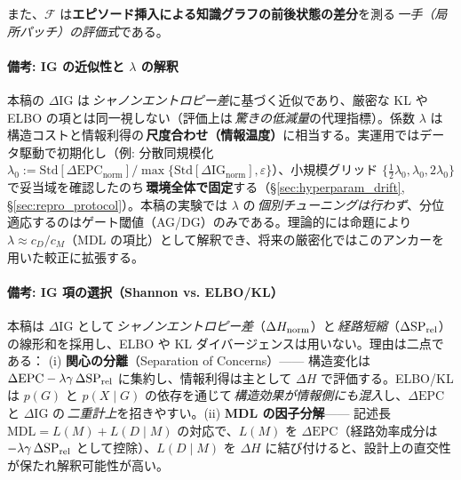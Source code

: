 \documentclass[ja=standard,xelatex]{bxjsarticle}
\newcommand{\F}{\mathcal{F}}
\newcommand{\gednorm}{\Delta\mathrm{EPC}_{\mathrm{norm}}}
\newcommand{\ignorm}{\Delta\mathrm{IG}_{\mathrm{norm}}}
\begin{document}

\noindent また、$\F$ は\textbf{エピソード挿入による知識グラフの前後状態の差分}を測る\,\emph{一手（局所パッチ）の評価式}である。



\paragraph{備考: IG の近似性と $\lambda$ の解釈}
本稿の $\Delta\mathrm{IG}$ は\,\emph{シャノンエントロピー差}に基づく近似であり、厳密な KL や ELBO の項とは同一視しない（評価上は\,\emph{驚きの低減量}の代理指標）。係数 $\lambda$ は構造コストと情報利得の\,\textbf{尺度合わせ（情報温度）}に相当する。実運用ではデータ駆動で初期化し（例: 分散同規模化 $\lambda_0:=\mathrm{Std}[\gednorm]/\max\{\mathrm{Std}[\ignorm],\varepsilon\}$）、小規模グリッド $\{\tfrac{1}{2}\lambda_0,\lambda_0,2\lambda_0\}$ で妥当域を確認したのち\,\textbf{環境全体で固定}する（\S\ref{sec:hyperparam_drift}, \S\ref{sec:repro_protocol}）。本稿の実験では $\lambda$ の\,\emph{個別チューニングは行わず}、分位適応するのはゲート閾値（AG/DG）のみである。理論的には命題により $\lambda\approx c_D/c_M$（MDL の項比）として解釈でき、将来の厳密化ではこのアンカーを用いた較正に拡張する。

\paragraph{備考: IG 項の選択（Shannon vs. ELBO/KL）}
本稿は $\Delta\mathrm{IG}$ として\,\emph{シャノンエントロピー差}（$\Delta H_{\rm norm}$）と\,\emph{経路短縮}（$\Delta\mathrm{SP}_{\rm rel}$）の線形和を採用し、ELBO や KL ダイバージェンスは用いない。理由は二点である： (i) \textbf{関心の分離}（Separation of Concerns）—— 構造変化は $\Delta\mathrm{EPC}-\lambda\gamma\,\Delta\mathrm{SP}_{\rm rel}$ に集約し、情報利得は主として $\Delta H$ で評価する。ELBO/KL は $p(G)$ と $p(X\mid G)$ の依存を通じて\,\emph{構造効果が情報側にも混入}し、$\Delta\mathrm{EPC}$ と $\Delta\mathrm{IG}$ の\,\emph{二重計上}を招きやすい。(ii) \textbf{MDL の因子分解}—— 記述長 $\mathrm{MDL}=L(M)+L(D\mid M)$ の対応で、$L(M)$ を $\Delta\mathrm{EPC}$（経路効率成分は $-\lambda\gamma\,\Delta\mathrm{SP}_{\rm rel}$ として控除）、$L(D\mid M)$ を $\Delta H$ に結び付けると、設計上の直交性が保たれ解釈可能性が高い。
\end{document}
